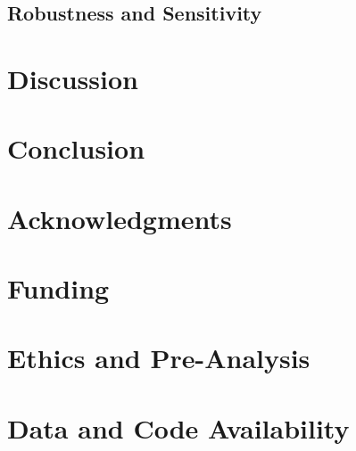 \documentclass[12pt]{article}
\begin{document}
\subsection{Robustness and Sensitivity}

\section{Discussion}

\section{Conclusion}

\section*{Acknowledgments}

\section*{Funding}

\section*{Ethics and Pre-Analysis}

\section*{Data and Code Availability}

\printbibliography[heading=bibintoc,title={References}]
\end{document}
